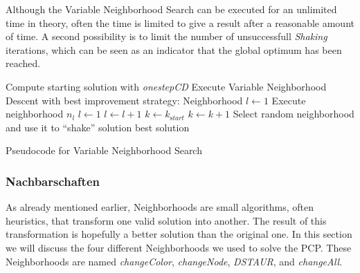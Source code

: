 \documentclass[paper=a4,fontsize=12pt]{scrartcl}
\begin{document}
{Although the Variable Neighborhood Search can be executed for an unlimited time in theory, often the time is limited to give a result after a reasonable amount of time. A second possibility is to limit the number of unsuccessfull \emph{Shaking} iterations, which can be seen as an indicator that the global optimum has been reached.


\begin{algorithm}
\begin{algorithmic}[1]
\State Compute starting solution with \emph{onestepCD}
\State Execute Variable Neighborhood Descent with best improvement strategy:
\State Neighborhood $l \leftarrow 1$
\State Execute neighborhood $n_l$
\State  $l\leftarrow 1$  
\Else
\State  $l\leftarrow l + 1$
\EndIf
\EndWhile
{}
\State $k \leftarrow k_{\mathrm start}$ 
\Else
\State $k \leftarrow k + 1$
\EndIf
\State Select random neighborhood and use it to ``shake'' solution
\EndWhile
\State\Return best solution
\end{algorithmic}
\caption{Pseudocode for Variable Neighborhood Search}
\end{algorithm}
}

\subsubsection{Nachbarschaften}
\label{sec:neigh}
As already mentioned earlier, Neighborhoods are small algorithms, often heuristics, that transform one valid solution into another. The result of this transformation is hopefully a better solution than the original one. In this section we will discuss the four different Neighborhoods we used to solve the PCP. These Neighborhoods are named \emph{changeColor}, \emph{changeNode}, \emph{DSTAUR}, and \emph{changeAll}.

\end{document}
